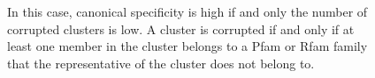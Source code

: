 \documentclass[11pt,letterpaper]{llncs2e/llncs}
\begin{document}
\begin{figure}
{	%
	In this case, canonical specificity is high if and only the number of corrupted clusters is low.
	A cluster is corrupted if and only if at least one member in the cluster belongs to a Pfam or Rfam family that the representative of the cluster does not belong to.
	\label{fig:pfam-appendix}
	}
\end{figure}












\iffalse
\end{document}
